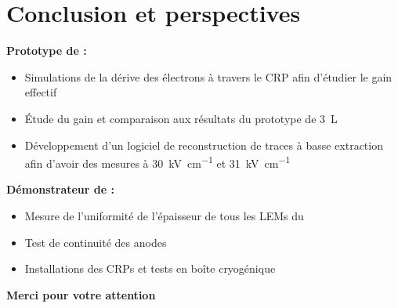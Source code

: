     \section{Conclusion et perspectives}
    {
        \begin{specialframe}
            \hspace*{-1.8cm}\parbox[t]{\textwidth}{
                        \centering \begin{huge}
                        \vspace{3cm}
                        \end{huge}
                        \textbf{Prototype de \TOO{} :}
                        \begin{itemize}
              	           	\item Simulations de la dérive des électrons à travers le CRP afin d'étudier le gain effectif
        	               	\item Étude du gain et comparaison aux résultats du prototype de \SI{3}{\liter}
          	               	\item Développement d'un logiciel de reconstruction de traces à basse extraction afin d'avoir des mesures à \SI{30}{\kilo\volt\per\centi\meter} et \SI{31}{\kilo\volt\per\centi\meter}
          	           	\end{itemize}
                        \vspace{0.3cm}
                        \textbf{ Démonstrateur de \SSS{} : }
                        \begin{itemize}
                            \item Mesure de l'uniformité de l'épaisseur de tous les LEMs du \SSS{}
                            \item Test de continuité des anodes
                            \item Installations des CRPs et tests en boîte cryogénique
                        \end{itemize}
                    }
        \end{specialframe}
    }
    
    {
        \begin{specialframe}
            \hspace*{-1.8cm}\parbox[t]{\textwidth}{
                \centering \begin{Huge}
                \vspace{1cm}
                \textbf{Merci pour votre attention}
                \end{Huge}
            }
        \end{specialframe}
    }
    
